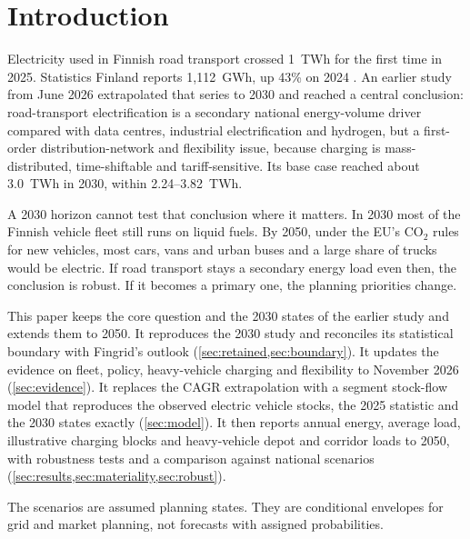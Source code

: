 \documentclass[11pt,a4paper]{article}
\begin{document}
\section{Introduction}
Electricity used in Finnish road transport crossed 1~TWh for the first time in 2025. Statistics Finland reports 1,112~GWh, up 43\% on 2024 \citep{statfin2026release,statfin2026_12sz}. An earlier study from June 2026 \citep{merilehto2026road2030} extrapolated that series to 2030 and reached a central conclusion: road-transport electrification is a secondary national energy-volume driver compared with data centres, industrial electrification and hydrogen, but a first-order distribution-network and flexibility issue, because charging is mass-distributed, time-shiftable and tariff-sensitive. Its base case reached about 3.0~TWh in 2030, within 2.24--3.82~TWh.

A 2030 horizon cannot test that conclusion where it matters. In 2030 most of the Finnish vehicle fleet still runs on liquid fuels. By 2050, under the EU's CO$_2$ rules for new vehicles, most cars, vans and urban buses and a large share of trucks would be electric. If road transport stays a secondary energy load even then, the conclusion is robust. If it becomes a primary one, the planning priorities change.

This paper keeps the core question and the 2030 states of the earlier study and extends them to 2050. It reproduces the 2030 study and reconciles its statistical boundary with Fingrid's outlook (\cref{sec:retained,sec:boundary}). It updates the evidence on fleet, policy, heavy-vehicle charging and flexibility to November 2026 (\cref{sec:evidence}). It replaces the CAGR extrapolation with a segment stock-flow model that reproduces the observed electric vehicle stocks, the 2025 statistic and the 2030 states exactly (\cref{sec:model}). It then reports annual energy, average load, illustrative charging blocks and heavy-vehicle depot and corridor loads to 2050, with robustness tests and a comparison against national scenarios (\cref{sec:results,sec:materiality,sec:robust}).

The scenarios are assumed planning states. They are conditional envelopes for grid and market planning, not forecasts with assigned probabilities.

\end{document}
